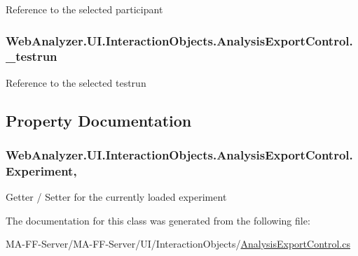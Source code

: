 Reference to the selected participant 

\hypertarget{class_web_analyzer_1_1_u_i_1_1_interaction_objects_1_1_analysis_export_control_adb1ac5a4139c8bee5b1c694983154936}{}
\subsubsection[{\+\_\+testrun}]{ Web\+Analyzer.\+U\+I.\+Interaction\+Objects.\+Analysis\+Export\+Control.\+\_\+testrun\hspace{0.3cm}{\ttfamily [private]}}\label{class_web_analyzer_1_1_u_i_1_1_interaction_objects_1_1_analysis_export_control_adb1ac5a4139c8bee5b1c694983154936}


Reference to the selected testrun 



\subsection{Property Documentation}
\hypertarget{class_web_analyzer_1_1_u_i_1_1_interaction_objects_1_1_analysis_export_control_a951604e49f2e9dfe33ec3cb1d8fdc4fa}{}
\subsubsection[{Experiment}]{ Web\+Analyzer.\+U\+I.\+Interaction\+Objects.\+Analysis\+Export\+Control.\+Experiment\hspace{0.3cm}{\ttfamily [get]}, {\ttfamily [set]}}\label{class_web_analyzer_1_1_u_i_1_1_interaction_objects_1_1_analysis_export_control_a951604e49f2e9dfe33ec3cb1d8fdc4fa}


Getter / Setter for the currently loaded experiment 



The documentation for this class was generated from the following file\+:\begin{DoxyCompactItemize}
\item 
M\+A-\/\+F\+F-\/\+Server/\+M\+A-\/\+F\+F-\/\+Server/\+U\+I/\+Interaction\+Objects/\hyperlink{_analysis_export_control_8cs}{Analysis\+Export\+Control.\+cs}\end{DoxyCompactItemize}
